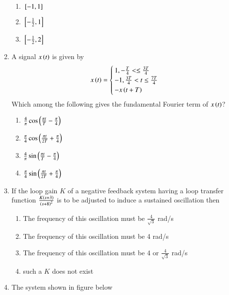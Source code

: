 \documentclass[journal]{IEEEtran}
\begin{document}
\begin{enumerate}
\begin{enumerate}
    \item ${}\left[-1, 1\right]$
    \item ${}\left[-\frac{1}{2}, 1\right]$
    \item ${}\left[-\frac{1}{2}, 2\right]$ \\
\end{enumerate}
\item A signal $x\left(t\right)$ is given by 
\begin{align*}
    x\left(t\right) = 
    \begin{cases}
        1, -\frac{T}{4} <  \leq \frac{3T}{4} \\
        -1, \frac{3T}{4} < t \leq \frac{7T}{4} \\
        -x\left(t + T\right)
    \end{cases}
\end{align*}
Which among the following gives the fundamental Fourier term of $x\left(t\right)$? 
\begin{enumerate}
    \item $\frac{4}{\pi}\cos\left(\frac{\pi t}{T} - \frac{\pi}{4}\right)$
    \item $\frac{\pi}{4}\cos\left(\frac{\pi t}{2T} + \frac{\pi}{4}\right)$
    \item $\frac{4}{\pi}\sin\left(\frac{\pi t}{T} - \frac{\pi}{4}\right)$
    \item $\frac{\pi}{4}\sin\left(\frac{\pi t}{2T} + \frac{\pi}{4}\right)$ \\
\end{enumerate}
 \item If the loop gain $K$ of a negative feedback system having a loop transfer function $\frac{K\left(s+3\right)}{\left(s+8\right)^2}$ is to be adjusted to induce a sustained oscillation then
 \begin{enumerate}
     \item The frequency of this oscillation must be $\frac{4}{\sqrt{3}}$ rad/s
     \item The frequency of this oscillation must be 4 rad/s
     \item The frequency of this oscillation must be 4 or $\frac{4}{\sqrt{3}}$ rad/s
     \item such a $K$ does not exist \\
 \end{enumerate}
\item The system shown in figure below
\begin{figure}[!ht]
\centering
{}
\end{figure}
\end{enumerate}
\end{document}
